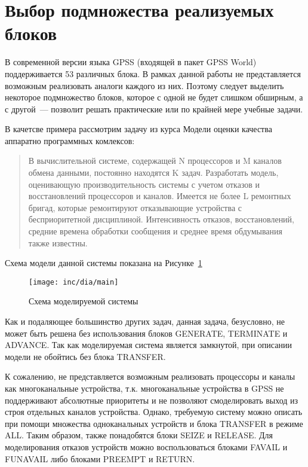 \section{Выбор подмножества реализуемых блоков}

В современной версии языка GPSS (входящей в пакет GPSS World) поддерживается 53 различных блока.\cite{GPSSRef} В рамках данной работы не представляется возможным реализовать  аналоги каждого из них. Поэтому следует выделить некоторое подмножество блоков, которое с одной не будет слишком обширным, а с другой~--- позволит решать практические или по крайней мере учебные задачи.

В качетсве примера рассмотрим задачу из курса Модели оценки качества аппаратно программных комлексов:

\begin{quote}
В вычислительной системе, содержащей N процессоров и M каналов обмена данными, постоянно находятся K задач. Разработать модель, оценивающую производительность системы с учетом отказов и восстановлений процессоров и каналов. Имеется не более L ремонтных бригад, которые ремонтируют отказывающие устройства с бесприоритетной  дисциплиной. Интенсивность отказов, восстановлений, средние времена обработки сообщения и среднее время обдумывания также известны.
\end{quote}

Схема модели данной системы показана на Рисунке~\ref{fig:mainModel}

\begin{figure}[ht]
\centering
\texttt{[image: inc/dia/main]}
\caption{Схема моделируемой системы}
\label{fig:mainModel}
\end{figure}

Как и подаляющее большинство других задач, данная задача, безусловно, не может быть решена без использования блоков GENERATE, TERMINATE и ADVANCE. Так как моделируемая система является замкнутой, при описании модели не обойтись без блока TRANSFER.

К сожалению, не представляется возможным реализовать процессоры и каналы как многоканальные устройства, т.к. многоканальные устройства в GPSS не поддерживают абсолютные приоритеты и не позволяют смоделировать выход из строя отдельных каналов устройства. Однако, требуемую систему можно описать при помощи множества одноканальных устройств и блока TRANSFER в режиме ALL. Таким образом, также понадобятся блоки SEIZE и RELEASE. Для моделирования отказов устройств можно воспользоваться блоками FAVAIL и FUNAVAIL либо блоками PREEMPT и RETURN.

